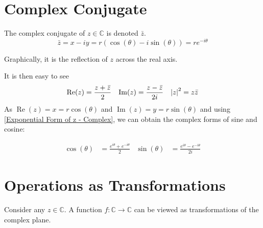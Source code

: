 \documentclass[12pt, english]{book}
\begin{document}
	
	\section{Complex Conjugate} \label{Complex Conjugate Section - Complex}
	\begin{definition}
		The complex conjugate of $z \in \mathbb{C}$ is denoted $\bar{z}$.
		$$\bar{z} = x - iy = r(\cos(\theta) - i\sin(\theta)) = re^{-i\theta}$$
		\label{Complex Conjugate}
	\end{definition}
	Graphically, it is the reflection of $z$ across the real axis.
	\begin{center}
	\end{center}
	It is then easy to see
	\begin{align*}
		\operatorname{Re}(z) &= \frac{z + \bar{z}}{2} & \operatorname{Im}(z) &= \frac{z - \bar{z}}{2i} & \abs{z}^2 = z \bar{z}
	\end{align*}
	As $\operatorname{Re}(z) = x = r \cos(\theta)$ and $\operatorname{Im}(z) = y = r \sin(\theta)$ and using \cref{Exponential Form of z - Complex}, we can obtain the complex forms of sine and cosine: 
	\begin{definition}
		\begin{align*}
			\cos(\theta) &= \frac{e^{i \theta} + e^{-i \theta}}{2} 
			&\sin(\theta) &= \frac{e^{i \theta} - e^{-i \theta}}{2i}
		\end{align*}
		\label{Trig Identities - Complex}
	\end{definition}


	\section{Operations as Transformations} \label{Operations as Transformations Section - Complex}
	
	Consider any $z \in \mathbb{C}$. A function $f: \mathbb{C} \rightarrow \mathbb{C}$ can be viewed as transformations of the complex plane. 
	
\end{document}
